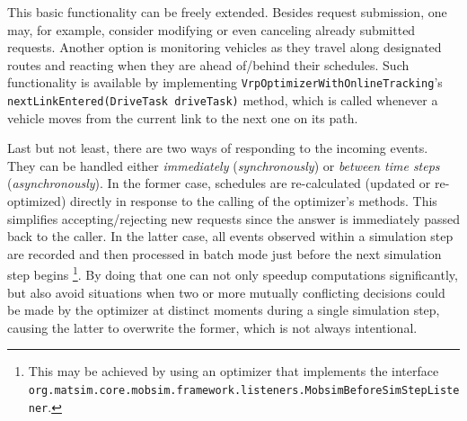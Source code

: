 This basic functionality can be freely extended. Besides request submission, one may, for example, consider modifying or even canceling already submitted requests. Another option is monitoring vehicles as they travel along designated routes and reacting when they are ahead of/behind their schedules. Such functionality is available by implementing \lstinline$VrpOptimizerWithOnlineTracking$'s \lstinline$nextLinkEntered(DriveTask driveTask)$ method, which is called whenever a vehicle moves from the current link to the next one on its path.

Last but not least, there are two ways of responding to the incoming events. They can be handled either \emph{immediately} (\emph{synchronously}) or \emph{between time steps} (\emph{asynchronously}). In the former case, schedules are re-calculated (updated or re-optimized) directly in response to the calling of the optimizer's methods. This simplifies accepting/rejecting new requests since the answer is immediately passed back to the caller. In the latter case, all events observed within a simulation step are recorded and then processed in batch mode just before the next simulation step begins%
\footnote{
This may be achieved by using an optimizer that implements the interface \lstinline$org.matsim.core.mobsim.framework.listeners.MobsimBeforeSimStepListener$. 
}.
By doing that one can not only speedup computations significantly, but also avoid situations when %
two or more mutually conflicting decisions could be made by the optimizer at distinct moments during a single simulation step, causing the latter to overwrite the former, which is not always intentional.

